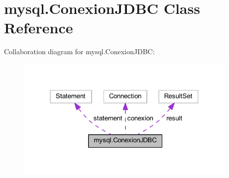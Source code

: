 \hypertarget{classmysql_1_1_conexion_j_d_b_c}{}\section{mysql.\+Conexion\+J\+D\+BC Class Reference}
\label{classmysql_1_1_conexion_j_d_b_c}


Collaboration diagram for mysql.\+Conexion\+J\+D\+BC\+:
\nopagebreak
\begin{figure}[H]
\begin{center}
\leavevmode
\includegraphics[width=303pt]{classmysql_1_1_conexion_j_d_b_c__coll__graph}
\end{center}
\end{figure}

